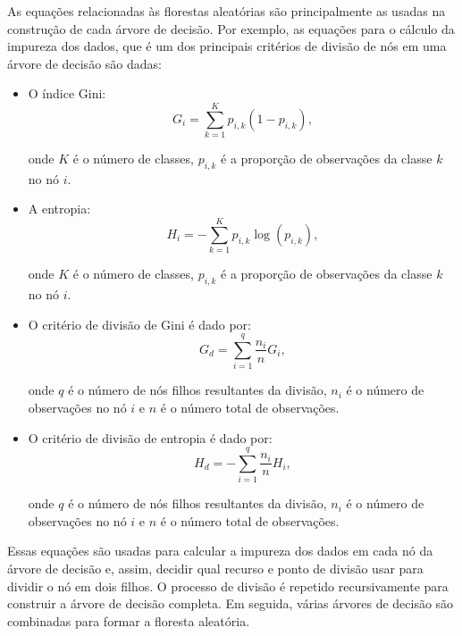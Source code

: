As equações relacionadas às florestas aleatórias são principalmente as usadas na construção de cada árvore de decisão. Por exemplo, as equações para o cálculo da impureza dos dados, que é um dos principais critérios de divisão de nós em uma árvore de decisão são dadas:

\begin{itemize}
    \item O índice Gini:
          \begin{equation}
              G_i = \sum_{k=1}^{K} p_{i,k} (1-p_{i,k}),
          \end{equation}

          onde $K$ é o número de classes, $p_{i,k}$ é a proporção de observações da classe $k$ no nó $i$.
    \item A entropia:
          \begin{equation}
              H_i = -\sum_{k=1}^{K} p_{i,k} \log(p_{i,k}),
          \end{equation}

          onde $K$ é o número de classes, $p_{i,k}$ é a proporção de observações da classe $k$ no nó $i$.

    \item O critério de divisão de Gini é dado por:
          \begin{equation}
              G_{d} = \sum_{i=1}^{q}\frac{n_i}{n}G_i,
          \end{equation}

          onde $q$ é o número de nós filhos resultantes da divisão, $n_i$ é o número de observações no nó $i$ e $n$ é o número total de observações.

    \item O critério de divisão de entropia é dado por:
          \begin{equation}
              H_{d} = -\sum_{i=1}^{q}\frac{n_i}{n}H_i,
          \end{equation}

          onde $q$ é o número de nós filhos resultantes da divisão, $n_i$ é o número de observações no nó $i$ e $n$ é o número total de observações.

\end{itemize}

Essas equações são usadas para calcular a impureza dos dados em cada nó da árvore de decisão e, assim, decidir qual recurso e ponto de divisão usar para dividir o nó em dois filhos. O processo de divisão é repetido recursivamente para construir a árvore de decisão completa. Em seguida, várias árvores de decisão são combinadas para formar a floresta aleatória.










